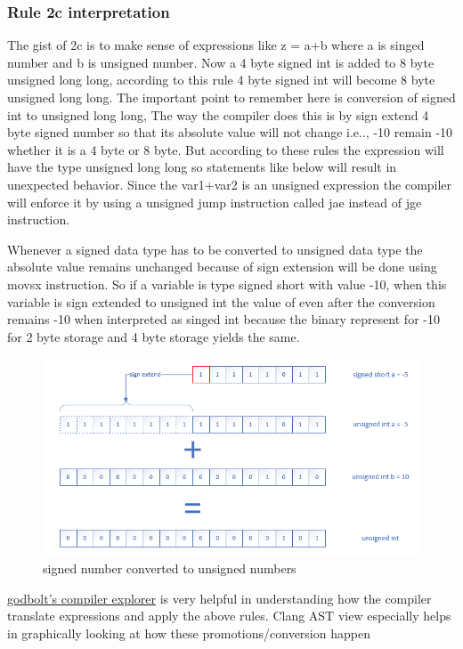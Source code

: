 \documentclass{article}
\begin{document}
\subsubsection{Rule 2c interpretation}
The gist of 2c is to make sense of
expressions like z = a+b where a is singed number and b is unsigned number. Now
a 4 byte signed int is added to 8 byte unsigned long long, according
to this rule 4 byte signed int will become 8 byte unsigned long long. The
important point to remember here is conversion of signed int to unsigned long
long, The way the compiler does this is by sign extend 4 byte signed number so
that its absolute value will not change i.e.., -10 remain -10 whether it is a 4
byte or 8 byte. But according to these rules the expression will have the type
unsigned long long so statements like below will result in unexpected behavior.
Since the var1+var2 is an unsigned expression the compiler will enforce it by
using a unsigned jump instruction called jae instead of jge instruction.

Whenever a signed data type has to be converted to unsigned data type the
absolute value remains unchanged because of sign extension will be done using
movsx instruction. So if a variable is type signed short with value -10, when
this variable is sign extended to unsigned int the value of even after the
conversion remains -10 when interpreted as singed int because the binary
represent for -10 for 2 byte storage and 4 byte storage yields the same.

\begin{figure}[H]
\centering
\includegraphics[width=\textwidth]{signed-short-to-unsigned-int.png}
\caption{signed number converted to unsigned numbers}
\end{figure}

\href{https://godbolt.org/}{godbolt's compiler explorer} is very helpful in
understanding how the compiler translate expressions and apply the above rules.
Clang AST view especially helps in graphically looking at how these
promotions/conversion happen
\end{document}
